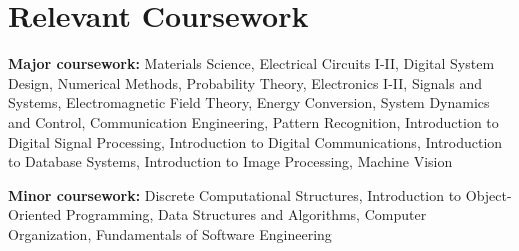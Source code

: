 \documentclass[letterpaper,11pt]{article}
\makeatletter
\newcommand{\resumeOrganizationHeading}[4]{
  \vspace{-2pt}\item
    \begin{tabular*}{0.97\textwidth}[t]{l@{\extracolsep{\fill}}r}
      \textbf{#1} & \textit{\small #2} \\
      \textit{\small#3}
    \end{tabular*}\vspace{-7pt}
}
\newcommand{\resumeSubHeadingListStart}{\begin{itemize}[leftmargin=0.15in, label={}]}
\newcommand{\resumeSubHeadingListEnd}{\end{itemize}}
\makeatother
\begin{document}
\section{Relevant Coursework}
  \vspace{2pt}
  \resumeSubHeadingListStart
    \small{\item{
        \textbf{Major coursework:}{ Materials Science, Electrical Circuits I-II, Digital System Design, Numerical Methods, Probability Theory, Electronics I-II, Signals and Systems, Electromagnetic Field Theory, Energy Conversion, System Dynamics and Control, Communication Engineering, Pattern Recognition, Introduction to Digital Signal Processing, Introduction to Digital Communications, Introduction to Database Systems, Introduction to Image Processing, Machine Vision} \\ \vspace{3pt}

        \textbf{Minor coursework:}{ Discrete Computational Structures, Introduction to Object-Oriented Programming, Data Structures and Algorithms, Computer Organization, Fundamentals of Software Engineering}
    }}
  \resumeSubHeadingListEnd















\end{document}
